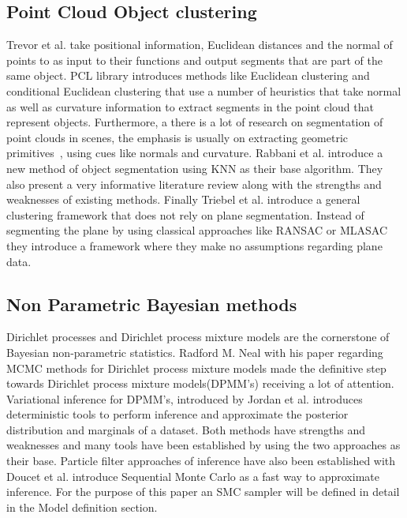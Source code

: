 \documentclass[]{article}
\begin{document}
\subsection{Point Cloud Object clustering}

Trevor et al.\cite{pointSeg} take positional information, Euclidean distances and the normal of points to as input to their functions and output segments that are part of the same object. PCL library\cite{pcl} introduces methods like Euclidean clustering and conditional Euclidean clustering that use a number of heuristics that take normal as well as curvature information to extract segments in the point cloud that represent objects. Furthermore, a there is a lot of research on segmentation of point clouds in scenes, the emphasis is usually on extracting geometric primitives~\cite{planarSeg},\cite{planarSeg2} using cues like normals and curvature. Rabbani et al.\cite{segOverview} introduce a new method of object segmentation using KNN as their base algorithm. They also present a very informative literature review along with the strengths and weaknesses of existing methods. Finally Triebel et al.\cite{smartSeg} introduce a general clustering framework that does not rely on plane segmentation. Instead of segmenting the plane by using classical approaches like RANSAC or MLASAC they introduce a framework where they make no assumptions regarding plane data. 

\subsection{Non Parametric Bayesian methods}

Dirichlet processes and Dirichlet process mixture models are the cornerstone of Bayesian non-parametric statistics. Radford M. Neal\cite{bayes:neal} with his paper regarding MCMC methods for Dirichlet process mixture models made the definitive step towards Dirichlet process mixture models(DPMM's) receiving a lot of attention. Variational inference for DPMM's, introduced by Jordan et al.\cite{bayes:jordan} introduces deterministic tools to perform inference and approximate the posterior distribution and marginals of a dataset. Both methods have strengths and weaknesses and many tools have been established by using the two approaches as their base. Particle filter approaches of inference  have also been established with  Doucet et al.\cite{bayes:smc} introduce Sequential Monte Carlo as a fast way to approximate inference. For the purpose of this paper an SMC sampler will be defined in detail in the Model definition section.
\end{document}
